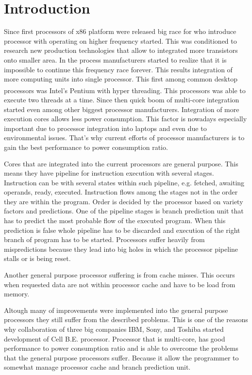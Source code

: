 \chapter{Introduction}

Since first processors of x86 platform were released big race for who introduce processor with operating on higher frequency started.
This was conditioned to research new production technologies that allow to integrated more transistors onto smaller area.
In the process manufacturers started to realize that it is impossible to continue this frequency race forever.
This results integration of more computing units into single processor.
This first among common desktop processors was Intel's Pentium\textsuperscript{\textregistered} with hyper threading.
This processors was able to execute two threads at a time.
Since then quick boom of multi-core integration started even among other biggest processor manufacturers.
Integration of more execution cores allows less power consumption.
This factor is nowadays especially important due to processor integration into laptops and even due to environmental issues.
That's why current efforts of processor manufacturers is to gain the best performance to power consumption ratio.

Cores that are integrated into the current processors are general purpose.
This means they have pipeline for instruction execution with several stages.
Instruction can be with several states within such pipeline, e.g. fetched, awaiting operands, ready, executed.
Instruction flows among the stages not in the order they are within the program.
Order is decided by the processor based on variety factors and predictions.
One of the pipeline stages is branch prediction unit that has to predict the most probable flow of the executed program.
When this prediction is false whole pipeline has to be discarded and execution of the right branch of program has to be started.
Processors suffer heavily from mispredictions because they lead into big holes in which the processor pipeline stalls or is being reset.

Another general purpose processor suffering is from cache misses.
This occurs when requested data are not within processor cache and have to be load from memory.

Altough many of improvements were implemented into the general purpose processors they still suffer from the described problems.
This is one of the reasons why collaboration of three big companies IBM, Sony, and Toshiba started development of Cell B.E. processor.
Processor that is multi-core, has good performance to power consumption ratio and is able to overcome the problems that the general purpose processors suffer.
Because it allow the programmer to somewhat manage processor cache and branch prediction unit.

